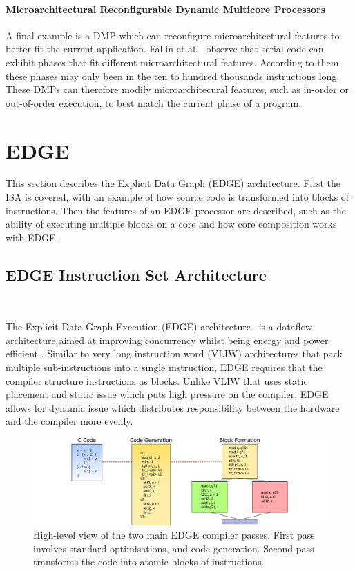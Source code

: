 \paragraph*{Microarchitectural Reconfigurable Dynamic Multicore Processors}
A final example is a DMP which can reconfigure microarchitectural features to better fit the current application.
Fallin et al.~\cite{fallinhetblock2014} observe that serial code can exhibit phases that fit different microarchitectural features.
According to them, these phases may only been in the ten to hundred thousands instructions long.
These DMPs can therefore modify microarchitecural features, such as in-order or out-of-order execution, to best match the current phase of a program.

\section{EDGE}\label{chp:bg:sec:edge}

This section describes the Explicit Data Graph (EDGE) architecture.
First the ISA is covered, with an example of how source code is transformed into blocks of instructions.
Then the features of an EDGE processor are described, such as the ability of executing multiple blocks on a core and how core composition works with EDGE.

\subsection{EDGE Instruction Set Architecture}~\label{sec:edge_isa}

The Explicit Data Graph Execution (EDGE) architecture~\cite{burger04edge} is a dataflow architecture aimed at improving concurrency whilst being energy and power efficient \cite{smith2006edge,burger04edge}.
Similar to very long instruction word (VLIW) architectures that pack multiple sub-instructions into a single instruction, EDGE requires that the compiler structure instructions as blocks.
Unlike VLIW that uses static placement and static issue which puts high pressure on the compiler, EDGE allows for dynamic issue which distributes responsibility between the hardware and the compiler more evenly.

\begin{figure}[t]
    \centering
    \includegraphics[width=1\textwidth]{background/graphics/EDGE_4.pdf}
    \caption{High-level view of the two main EDGE compiler passes. First pass involves standard optimisations, and code generation. Second pass transforms the code into atomic blocks of instructions.}
    \label{fig:EdgeHigh}
\end{figure}
